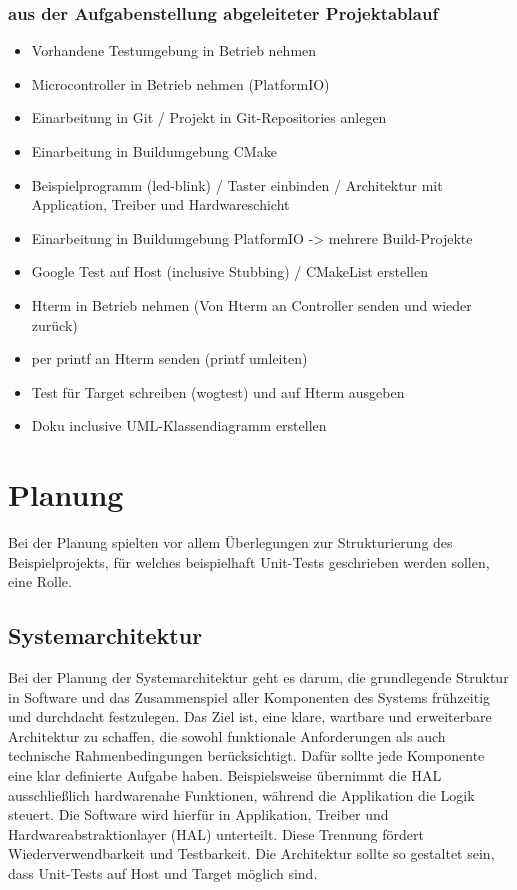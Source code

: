 \documentclass[12pt,a4paper]{article}
\begin{document}
\newpage
\subsubsection{aus der Aufgabenstellung abgeleiteter Projektablauf}
\begin{itemize}
  \item Vorhandene Testumgebung in Betrieb nehmen
  \item Microcontroller in Betrieb nehmen (PlatformIO)
  \item Einarbeitung in Git / Projekt in Git-Repositories anlegen
  \item Einarbeitung in Buildumgebung CMake
  \item Beispielprogramm (led-blink) / Taster einbinden / Architektur mit Application, Treiber und Hardwareschicht
  \item Einarbeitung in Buildumgebung PlatformIO -> mehrere Build-Projekte
  \item Google Test auf Host (inclusive Stubbing) / CMakeList erstellen
  \item Hterm in Betrieb nehmen (Von Hterm an Controller senden und wieder zurück)
  \item per printf an Hterm senden (printf umleiten)
  \item Test für Target schreiben (wogtest) und auf Hterm ausgeben
  \item Doku inclusive UML-Klassendiagramm erstellen
\end{itemize}



\newpage

\section{Planung}
Bei der Planung spielten vor allem Überlegungen zur Strukturierung des Beispielprojekts, für welches beispielhaft Unit-Tests geschrieben werden sollen, eine Rolle.
\subsection{Systemarchitektur}
Bei der Planung der Systemarchitektur geht es darum, die grundlegende Struktur in Software und das Zusammenspiel aller Komponenten des Systems frühzeitig und durchdacht festzulegen. Das Ziel ist, eine klare, wartbare und erweiterbare Architektur zu schaffen, die sowohl funktionale Anforderungen als auch technische Rahmenbedingungen berücksichtigt. Dafür sollte jede Komponente eine klar definierte Aufgabe haben. Beispielsweise übernimmt die HAL ausschließlich hardwarenahe Funktionen, während die Applikation die Logik steuert. Die Software wird hierfür in Applikation, Treiber und Hardwareabstraktionlayer (HAL) unterteilt. Diese Trennung fördert Wiederverwendbarkeit und Testbarkeit. Die Architektur sollte so gestaltet sein, dass Unit-Tests auf Host und Target möglich sind.
\end{document}
